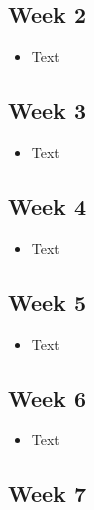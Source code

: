 \documentclass[10pt, onecolumn, draftclsnofoot, letterpaper, compsoc]{IEEEtran}
\begin{document}
\subsection{Week 2}

\begin{itemize}

\item Text

\end{itemize}

\subsection{Week 3}

\begin{itemize}

\item Text

\end{itemize}

\subsection{Week 4}

\begin{itemize}

\item Text

\end{itemize}

\subsection{Week 5}

\begin{itemize}

\item Text

\end{itemize}

\subsection{Week 6}

\begin{itemize}

\item Text

\end{itemize}

\subsection{Week 7}
\end{document}
